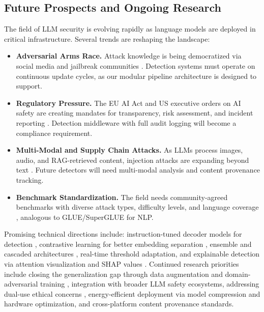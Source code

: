 \documentclass[12pt, letterpaper]{article}   %
\begin{document}
\subsection{Future Prospects and Ongoing Research}

The field of LLM security is evolving rapidly as language models are deployed in critical infrastructure. Several trends are reshaping the landscape:

\begin{itemize}
    \item \textbf{Adversarial Arms Race.} Attack knowledge is being democratized via social media and jailbreak communities \cite{ref3}\cite{ref43}. Detection systems must operate on continuous update cycles, as our modular pipeline architecture is designed to support.

    \item \textbf{Regulatory Pressure.} The EU AI Act and US executive orders on AI safety are creating mandates for transparency, risk assessment, and incident reporting \cite{ref14}\cite{ref19}. Detection middleware with full audit logging will become a compliance requirement.

    \item \textbf{Multi-Modal and Supply Chain Attacks.} As LLMs process images, audio, and RAG-retrieved content, injection attacks are expanding beyond text \cite{ref16}\cite{ref4}\cite{ref21}. Future detectors will need multi-modal analysis and content provenance tracking.

    \item \textbf{Benchmark Standardization.} The field needs community-agreed benchmarks with diverse attack types, difficulty levels, and language coverage \cite{ref3}\cite{ref10}, analogous to GLUE/SuperGLUE for NLP.
\end{itemize}

Promising technical directions include: instruction-tuned decoder models for detection \cite{ref8}, contrastive learning for better embedding separation \cite{ref33}\cite{ref39}, ensemble and cascaded architectures \cite{ref7}\cite{ref38}, real-time threshold adaptation, and explainable detection via attention visualization and SHAP values \cite{ref10}. Continued research priorities include closing the generalization gap through data augmentation and domain-adversarial training \cite{ref28}\cite{ref20}\cite{ref43}, integration with broader LLM safety ecosystems, addressing dual-use ethical concerns \cite{ref25}\cite{ref43}, energy-efficient deployment via model compression and hardware optimization, and cross-platform content provenance standards.
\end{document}
